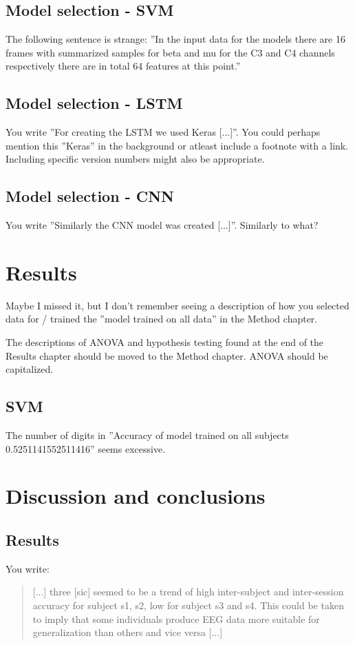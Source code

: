 \documentclass[a4paper,12pt]{article}
\begin{document}
\subsection{Model selection - SVM} \label{strangesentence}
The following sentence is strange: ''In the input data for the models there are 16 frames with
summarized samples for beta and mu for the C3 and C4 channels respectively there are in total 64
features at this point.''

\subsection{Model selection - LSTM}
You write ''For creating the LSTM we used Keras [...]''. You could perhaps mention this ''Keras'' in
the background or atleast include a footnote with a link. Including specific version numbers might also be
appropriate.

\subsection{Model selection - CNN}
\label{similarly}
You write ''Similarly the CNN model was created [...]''. Similarly to what?

\section{Results}
Maybe I missed it, but I don't remember seeing a description of how you selected data for / trained the
''model trained on all data'' in the Method chapter.

The descriptions of ANOVA and hypothesis testing found at the end of the Results chapter should be
moved to the Method chapter. ANOVA should be capitalized.

\subsection{SVM}
The number of digits in ''Accuracy of model trained on all subjects 0.5251141552511416'' seems
excessive.

\section{Discussion and conclusions}
\subsection{Results}
You write:

\begin{quote}
    [...] three [sic] seemed to be a trend of high inter-subject and inter-session accuracy for
    subject s1, s2, low for subject s3 and s4. This could be taken to imply that some individuals
    produce EEG data more suitable for generalization than others and vice versa [...]
\end{quote}
\end{document}
